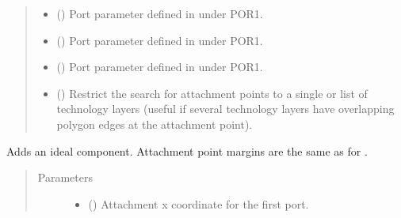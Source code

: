 \documentclass[letterpaper,10pt,english,openany]{sphinxmanual}
\begin{document}
\begin{fulllineitems}
\begin{fulllineitems}
\begin{quote}
\begin{description}
\begin{itemize}
\item {} 
 () \textendash{} Port parameter defined in \label{\detokenize{source/sonpy:id2}}{\hyperref[\detokenize{source/users_guide:son15}]{\sphinxcrossref{{[}Son15{]}}}} under POR1.

\item {} 
 () \textendash{} Port parameter defined in \label{\detokenize{source/sonpy:id3}}{\hyperref[\detokenize{source/users_guide:son15}]{\sphinxcrossref{{[}Son15{]}}}} under POR1.

\item {} 
 () \textendash{} Port parameter defined in \label{\detokenize{source/sonpy:id4}}{\hyperref[\detokenize{source/users_guide:son15}]{\sphinxcrossref{{[}Son15{]}}}} under POR1.

\item {} 
 () \textendash{} Restrict the search for attachment points to a single or list of technology layers (useful if several technology layers have overlapping polygon edges at the attachment point).

\end{itemize}

\end{description}\end{quote}

\end{fulllineitems}


\begin{fulllineitems}
\label{\detokenize{source/sonpy:sonpy.sonnet.addComponent}}
Adds an ideal component. Attachment point margins are the same as for {\hyperref[\detokenize{source/sonpy:sonpy.sonnet.addPort}]{}}.
\begin{quote}\begin{description}
\item[{Parameters}] \leavevmode\begin{itemize}
\item {} 
 () \textendash{} Attachment x coordinate for the first port.


\end{itemize}
\end{description}
\end{quote}
\end{fulllineitems}
\end{fulllineitems}
\end{document}
